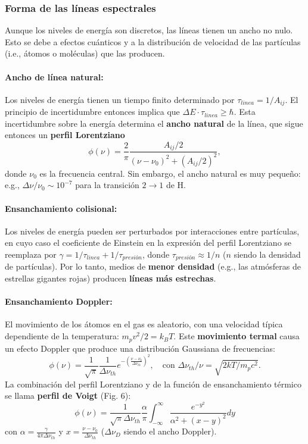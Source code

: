 \documentclass[11pt,letterpaper]{article}
\begin{document}
\subsubsection{Forma de las líneas espectrales}

Aunque los niveles de energía son discretos, las líneas tienen un ancho no nulo. Esto se debe a efectos cuánticos y a la distribución de velocidad de las partículas (i.e., átomos o moléculas) que las producen.

\paragraph{Ancho de línea natural:}
Los niveles de energía tienen un tiempo finito determinado por \(\tau_{linea} = 1/A_{ij}\). El principio de incertidumbre entonces implica que \(\Delta E \cdot \tau_{linea} \ge \hbar\). Esta incertidumbre sobre la energía determina el \textbf{ancho natural} de la línea, que sigue entonces un \textbf{perfil Lorentziano}
\begin{equation}
    \phi(\nu) = \frac{2}{\pi} \frac{A_{ij}/2}{(\nu - \nu_0)^2 + (A_{ij}/2)^2},
\end{equation}
donde \(\nu_0\) es la frecuencia central. Sin embargo, el ancho natural es muy pequeño: e.g., \(\Delta\nu/\nu_0 \sim 10^{-7}\) para la transición \(2 \to 1\) de H.

\paragraph{Ensanchamiento colisional:}
Los niveles de energía pueden ser perturbados por interacciones entre partículas, en cuyo caso el coeficiente de Einstein en la expresión del perfil Lorentziano se reemplaza por \(\gamma = 1/\tau_{linea} + 1/\tau_{presión}\), donde \(\tau_{presión} \approx 1/n\) (\(n\) siendo la densidad de partículas). Por lo tanto, medios de \textbf{menor densidad} (e.g., las atmósferas de estrellas gigantes rojas) producen \textbf{líneas más estrechas}.

\paragraph{Ensanchamiento Doppler:}
El movimiento de los átomos en el gas es aleatorio, con una velocidad típica dependiente de la temperatura: \(m_p v^2/2 = k_B T\). Este \textbf{movimiento termal} causa un efecto Doppler que produce una distribución Gaussiana de frecuencias:
\begin{equation}
    \phi(\nu) = \frac{1}{\sqrt{\pi}} \frac{1}{\Delta \nu_{th}} e^{-\left( \frac{\nu - \nu_0}{\Delta \nu_{th}} \right)^2}, \quad \text{con } \Delta \nu_{th}/\nu = \sqrt{2kT/m_p c^2}.
\end{equation}
La combinación del perfil Lorentziano y de la función de ensanchamiento térmico se llama \textbf{perfil de Voigt} (Fig. 6):
\begin{equation}
    \phi(\nu) = \frac{1}{\sqrt{\pi} \Delta \nu_{th}} \frac{\alpha}{\pi} \int_{-\infty}^{\infty} \frac{e^{-y^2}}{\alpha^2 + (x - y)^2} dy
\end{equation}
con \(\alpha = \frac{\gamma}{4\pi \Delta \nu_{th}}\) y \(x = \frac{\nu - \nu_0}{\Delta \nu_{th}}\) (\(\Delta \nu_D\) siendo el ancho Doppler).
\end{document}
